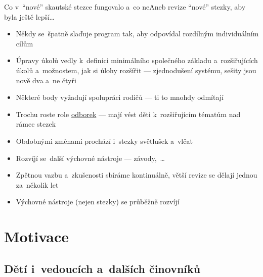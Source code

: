 \documentclass[compress, xelatex, 11pt, xcolor=dvipsnames, print, aspectratio=169,
	hyperref={
		bookmarks=true,
		unicode=true,
		colorlinks=true,
		pdftitle={Skautska vychovna metoda},
		plainpages=false,
		pdfauthor={Vojtech Zeisek},
		pdfsubject={Skautska vychovna metoda a jeji vyvoj za posledni stoleti a desetileti},
		pdfcreator={XeLaTeX},
		pdfkeywords={Junak, Pedagogika, Skaut, Skauting, Vychovna metoda},
		linkcolor=Red, %
		anchorcolor=ForestGreen, %
		citecolor=ForestGreen, %
		filecolor=ForestGreen, %
		menucolor=ForestGreen, %
		urlcolor=Sepia, %
		pdftex},
	url={hyphens, lowtilde} %
	]{beamer}
\begin{document}
\begin{frame}{Co v~\enquote{nové} skautské stezce fungovalo a~co ne}{Aneb revize \enquote{nové} stezky, aby byla ještě lepší\ldots}
	\begin{itemize}
		\item Někdy se~špatně slaďuje program tak, aby odpovídal rozdílným individuálním cílům
		\item Úpravy úkolů vedly k~definici minimálního společného základu a~rozšiřujících úkolů a~možnostem, jak si úlohy rozšířit --- zjednodušení systému, sešity jsou nově dva a~ne čtyři
		\item Některé body vyžadují spolupráci rodičů --- ti to mnohdy odmítají
		\item Trochu roste role \href{https://odborky.skaut.cz/}{odborek} --- mají vést děti k~rozšiřujícím tématům nad rámec stezek
		\item Obdobnými změnami prochází i~stezky světlušek a~vlčat
		\item Rozvíjí se~další výchovné nástroje --- závody,~\ldots
		\item Zpětnou vazbu a~zkušenosti sbíráme kontinuálně, větší revize se dělají jednou za~několik let
		\item Výchovné nástroje (nejen stezky) se průběžně rozvíjí
	\end{itemize}
\end{frame}

\section{Motivace}

\subsection{Dětí i~vedoucích a~dalších činovníků}
\end{document}
